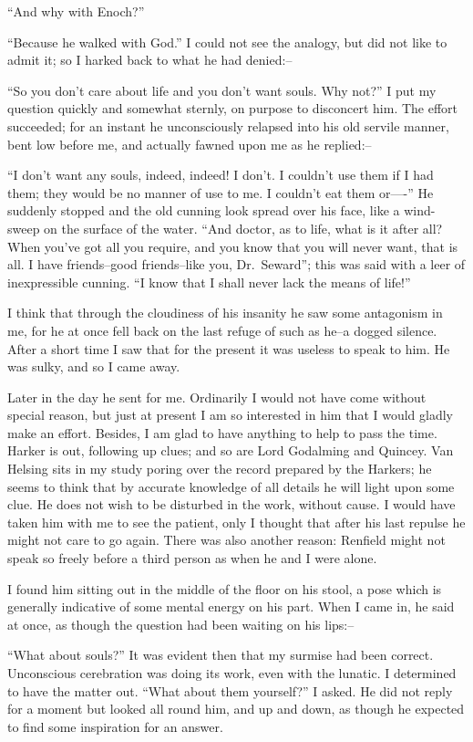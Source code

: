 \documentclass[12pt,openright]{book}
\begin{document}
“And why with Enoch?”

“Because he walked with God.” I could not see the analogy, but did not like to admit it; so I harked back to what he had denied:–

“So you don’t care about life and you don’t want souls. Why not?” I put my question quickly and somewhat sternly, on purpose to disconcert him. The effort succeeded; for an instant he unconsciously relapsed into his old servile manner, bent low before me, and actually fawned upon me as he replied:–

“I don’t want any souls, indeed, indeed! I don’t. I couldn’t use them if I had them; they would be no manner of use to me. I couldn’t eat them or—-” He suddenly stopped and the old cunning look spread over his face, like a wind-sweep on the surface of the water. “And doctor, as to life, what is it after all? When you’ve got all you require, and you know that you will never want, that is all. I have friends–good friends–like you, Dr. Seward”; this was said with a leer of inexpressible cunning. “I know that I shall never lack the means of life!”

I think that through the cloudiness of his insanity he saw some antagonism in me, for he at once fell back on the last refuge of such as he–a dogged silence. After a short time I saw that for the present it was useless to speak to him. He was sulky, and so I came away.

Later in the day he sent for me. Ordinarily I would not have come without special reason, but just at present I am so interested in him that I would gladly make an effort. Besides, I am glad to have anything to help to pass the time. Harker is out, following up clues; and so are Lord Godalming and Quincey. Van Helsing sits in my study poring over the record prepared by the Harkers; he seems to think that by accurate knowledge of all details he will light upon some clue. He does not wish to be disturbed in the work, without cause. I would have taken him with me to see the patient, only I thought that after his last repulse he might not care to go again. There was also another reason: Renfield might not speak so freely before a third person as when he and I were alone.

I found him sitting out in the middle of the floor on his stool, a pose which is generally indicative of some mental energy on his part. When I came in, he said at once, as though the question had been waiting on his lips:–

“What about souls?” It was evident then that my surmise had been correct. Unconscious cerebration was doing its work, even with the lunatic. I determined to have the matter out. “What about them yourself?” I asked. He did not reply for a moment but looked all round him, and up and down, as though he expected to find some inspiration for an answer.
\end{document}
